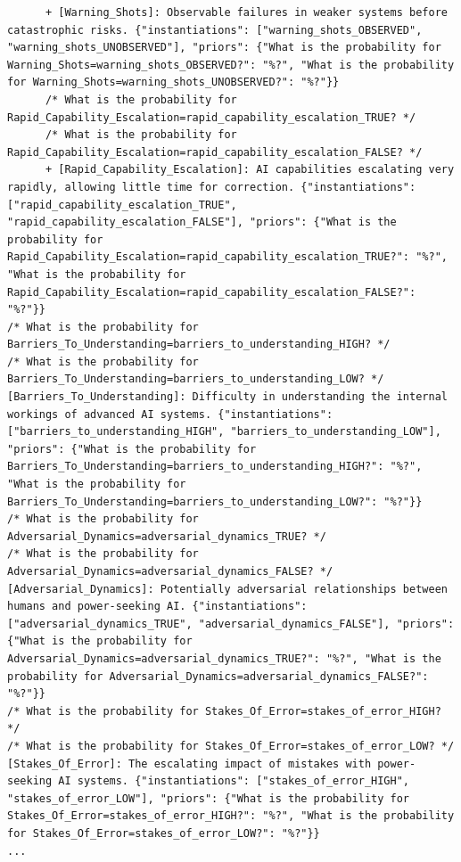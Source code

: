 \documentclass[
  11pt,
  letterpaper,
]{book}
\begin{document}
\begin{landscape}
\begin{verbatim}
      + [Warning_Shots]: Observable failures in weaker systems before catastrophic risks. {"instantiations": ["warning_shots_OBSERVED", "warning_shots_UNOBSERVED"], "priors": {"What is the probability for Warning_Shots=warning_shots_OBSERVED?": "%?", "What is the probability for Warning_Shots=warning_shots_UNOBSERVED?": "%?"}}
      /* What is the probability for Rapid_Capability_Escalation=rapid_capability_escalation_TRUE? */
      /* What is the probability for Rapid_Capability_Escalation=rapid_capability_escalation_FALSE? */
      + [Rapid_Capability_Escalation]: AI capabilities escalating very rapidly, allowing little time for correction. {"instantiations": ["rapid_capability_escalation_TRUE", "rapid_capability_escalation_FALSE"], "priors": {"What is the probability for Rapid_Capability_Escalation=rapid_capability_escalation_TRUE?": "%?", "What is the probability for Rapid_Capability_Escalation=rapid_capability_escalation_FALSE?": "%?"}}
/* What is the probability for Barriers_To_Understanding=barriers_to_understanding_HIGH? */
/* What is the probability for Barriers_To_Understanding=barriers_to_understanding_LOW? */
[Barriers_To_Understanding]: Difficulty in understanding the internal workings of advanced AI systems. {"instantiations": ["barriers_to_understanding_HIGH", "barriers_to_understanding_LOW"], "priors": {"What is the probability for Barriers_To_Understanding=barriers_to_understanding_HIGH?": "%?", "What is the probability for Barriers_To_Understanding=barriers_to_understanding_LOW?": "%?"}}
/* What is the probability for Adversarial_Dynamics=adversarial_dynamics_TRUE? */
/* What is the probability for Adversarial_Dynamics=adversarial_dynamics_FALSE? */
[Adversarial_Dynamics]: Potentially adversarial relationships between humans and power-seeking AI. {"instantiations": ["adversarial_dynamics_TRUE", "adversarial_dynamics_FALSE"], "priors": {"What is the probability for Adversarial_Dynamics=adversarial_dynamics_TRUE?": "%?", "What is the probability for Adversarial_Dynamics=adversarial_dynamics_FALSE?": "%?"}}
/* What is the probability for Stakes_Of_Error=stakes_of_error_HIGH? */
/* What is the probability for Stakes_Of_Error=stakes_of_error_LOW? */
[Stakes_Of_Error]: The escalating impact of mistakes with power-seeking AI systems. {"instantiations": ["stakes_of_error_HIGH", "stakes_of_error_LOW"], "priors": {"What is the probability for Stakes_Of_Error=stakes_of_error_HIGH?": "%?", "What is the probability for Stakes_Of_Error=stakes_of_error_LOW?": "%?"}}
...
\end{verbatim}


\end{landscape}
\end{document}
